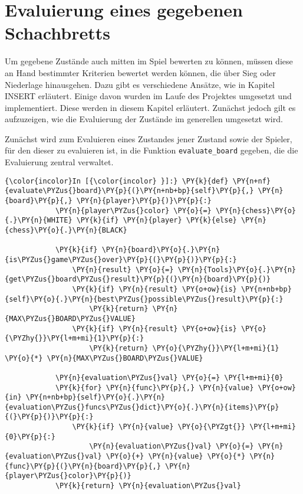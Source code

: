    \section{Evaluierung eines gegebenen
Schachbretts}\label{evaluierung-eines-gegebenen-schachbretts}

    Um gegebene Zustände auch mitten im Spiel bewerten zu können, müssen
diese an Hand bestimmter Kriterien bewertet werden können, die über Sieg
oder Niederlage hinausgehen. Dazu gibt es verschiedene Ansätze, wie in
Kapitel INSERT erläutert. Einige davon wurden im Laufe des Projektes
umgesetzt und implementiert. Diese werden in diesem Kapitel erläutert.
Zunächst jedoch gilt es aufzuzeigen, wie die Evaluierung der Zustände im
generellen umgesetzt wird.

Zunächst wird zum Evaluieren eines Zustandes jener Zustand sowie der
Spieler, für den dieser zu evaluieren ist, in die Funktion
\texttt{evaluate\_board} gegeben, die die Evaluierung zentral verwaltet.

    \begin{Verbatim}[commandchars=\\\{\}]
{\color{incolor}In [{\color{incolor} }]:} \PY{k}{def} \PY{n+nf}{evaluate\PYZus{}board}\PY{p}{(}\PY{n+nb+bp}{self}\PY{p}{,} \PY{n}{board}\PY{p}{,} \PY{n}{player}\PY{p}{)}\PY{p}{:}
            \PY{n}{player\PYZus{}color} \PY{o}{=} \PY{n}{chess}\PY{o}{.}\PY{n}{WHITE} \PY{k}{if} \PY{n}{player} \PY{k}{else} \PY{n}{chess}\PY{o}{.}\PY{n}{BLACK}
        
            \PY{k}{if} \PY{n}{board}\PY{o}{.}\PY{n}{is\PYZus{}game\PYZus{}over}\PY{p}{(}\PY{p}{)}\PY{p}{:}
                \PY{n}{result} \PY{o}{=} \PY{n}{Tools}\PY{o}{.}\PY{n}{get\PYZus{}board\PYZus{}result}\PY{p}{(}\PY{n}{board}\PY{p}{)}
                \PY{k}{if} \PY{n}{result} \PY{o+ow}{is} \PY{n+nb+bp}{self}\PY{o}{.}\PY{n}{best\PYZus{}possible\PYZus{}result}\PY{p}{:}
                    \PY{k}{return} \PY{n}{MAX\PYZus{}BOARD\PYZus{}VALUE}
                \PY{k}{if} \PY{n}{result} \PY{o+ow}{is} \PY{o}{\PYZhy{}}\PY{l+m+mi}{1}\PY{p}{:}
                    \PY{k}{return} \PY{o}{\PYZhy{}}\PY{l+m+mi}{1} \PY{o}{*} \PY{n}{MAX\PYZus{}BOARD\PYZus{}VALUE}
        
            \PY{n}{evaluation\PYZus{}val} \PY{o}{=} \PY{l+m+mi}{0}
            \PY{k}{for} \PY{n}{func}\PY{p}{,} \PY{n}{value} \PY{o+ow}{in} \PY{n+nb+bp}{self}\PY{o}{.}\PY{n}{evaluation\PYZus{}funcs\PYZus{}dict}\PY{o}{.}\PY{n}{items}\PY{p}{(}\PY{p}{)}\PY{p}{:}
                \PY{k}{if} \PY{n}{value} \PY{o}{\PYZgt{}} \PY{l+m+mi}{0}\PY{p}{:}
                    \PY{n}{evaluation\PYZus{}val} \PY{o}{=} \PY{n}{evaluation\PYZus{}val} \PY{o}{+} \PY{n}{value} \PY{o}{*} \PY{n}{func}\PY{p}{(}\PY{n}{board}\PY{p}{,} \PY{n}{player\PYZus{}color}\PY{p}{)}
            \PY{k}{return} \PY{n}{evaluation\PYZus{}val}
\end{Verbatim}

